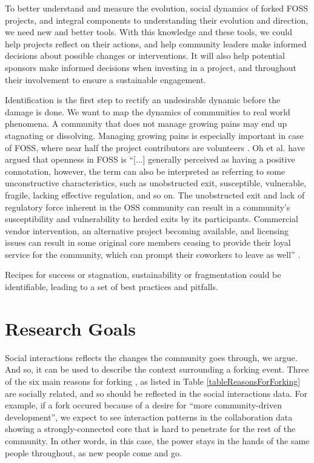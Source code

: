 \documentclass{acm_proc_article-sp}
\begin{document}
To better understand and measure the evolution, social dynamics of forked FOSS projects, and integral components to understanding their evolution and direction, we need new and better tools. With this knowledge and these tools, we could help projects reflect on their actions, and help community leaders make informed decisions about possible changes or interventions. It will also help potential sponsors make informed decisions when investing in a project, and throughout their involvement to ensure a sustainable engagement. 

Identification is the first step to rectify an undesirable dynamic before the damage is done. We want to map the dynamics of communities to real world phenomena. A community that does not manage growing pains may end up stagnating or dissolving. Managing growing pains is especially important in case of FOSS, where near half the project contributors are volunteers \cite{Forrest}. Oh et al. \cite{Oh} have argued that openness in FOSS is ``[...] generally perceived as having a positive connotation, however, the term can also be interpreted as referring to some unconstructive characteristics, such as unobstructed exit, susceptible, vulnerable, fragile, lacking effective regulation, and so on. The unobstructed exit and lack of regulatory force inherent in the OSS community can result in a community's susceptibility and vulnerability to herded exits by its participants. Commercial vendor intervention, an alternative project becoming available, and licensing issues can result in some original core members ceasing to provide their loyal service for the community, which can prompt their coworkers to leave as well'' \cite{Oh}.

Recipes for success or stagnation, sustainability or fragmentation could be identifiable, leading to a set of best practices and pitfalls.

\section{Research Goals}
\label{ResearchGoalsAndMethods}

Social interactions reflects the changes the community goes through, we argue. And so, it can be used to describe the context surrounding a forking event. Three of the six main reasons for forking \cite{Robles}, as listed in Table \ref{tableReasonsForForking} are socially related, and so should be reflected in the social interactions data. For example, if a fork occured because of a desire for ``more community-driven development'', we expect to see interaction patterns in the collaboration data showing a strongly-connected core that is hard to penetrate for the rest of the community. In other words, in this case, the power stays in the hands of the same people throughout, as new people come and go. 
\end{document}
